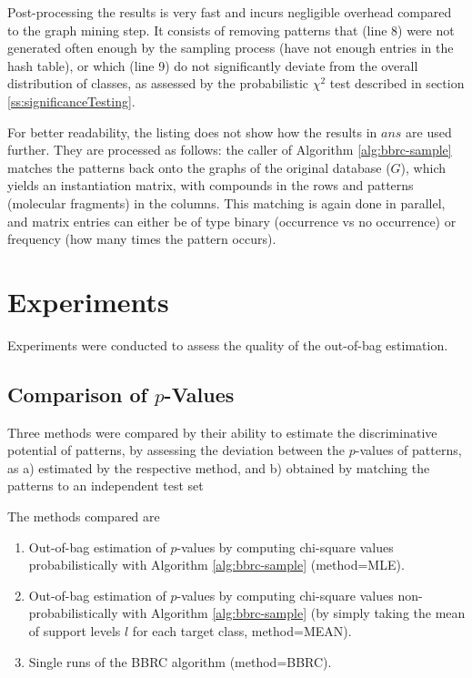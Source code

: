 \documentclass{article}
\begin{document}
Post-processing the results is very fast and incurs negligible overhead compared to the graph mining step. It consists of removing patterns that (line 8) were not generated often enough by the sampling process (have not enough entries in the hash table), or which (line 9) do not significantly deviate from the overall distribution of classes, as assessed by the probabilistic $\chi^2$ test described in section \ref{ss:significanceTesting}.

For better readability, the listing does not show how the results in $ans$ are used further. They are processed as follows: the caller of Algorithm \ref{alg:bbrc-sample} matches the patterns back onto the graphs of the original database ($G$), which yields an instantiation matrix, with compounds in the rows and patterns (molecular fragments) in the columns. This matching is again done in parallel, and matrix entries can either be of type binary (occurrence vs no occurrence) or frequency (how many times the pattern occurs).

\section{Experiments}
Experiments were conducted to assess the quality of the out-of-bag estimation.

\subsection{Comparison of $p$-Values}
Three methods were compared by their ability to estimate the discriminative potential of patterns, by assessing the deviation between the $p$-values of patterns, as
a) estimated by the respective method, and 
b) obtained by matching the patterns to an independent test set

The methods compared are

\begin{enumerate}
  \item{Out-of-bag estimation of $p$-values by computing chi-square values probabilistically with Algorithm \ref{alg:bbrc-sample} (method=MLE).}
  \item{Out-of-bag estimation of $p$-values by computing chi-square values non-probabilistically with Algorithm \ref{alg:bbrc-sample} (by simply taking the mean of support levels $l$ for each target class, method=MEAN).}
  \item{Single runs of the BBRC algorithm (method=BBRC).} 
\end{enumerate}
\end{document}
